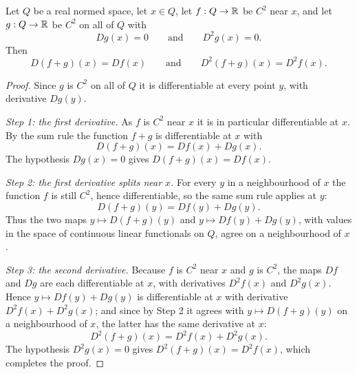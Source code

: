 \begin{lemma}
Let $Q$ be a real normed space, let $x\in Q$, let $f:Q\to\mathbb{R}$ be $C^2$ near $x$, and let
$g:Q\to\mathbb{R}$ be $C^2$ on all of $Q$ with
\[
  Dg(x)=0\qquad\text{and}\qquad D^2g(x)=0 .
\]
Then
\[
  D(f+g)(x)=Df(x)\qquad\text{and}\qquad D^2(f+g)(x)=D^2f(x).
\]
\end{lemma}
\begin{proof}
Since $g$ is $C^2$ on all of $Q$ it is differentiable at every point $y$, with
derivative $Dg(y)$.

\emph{Step 1: the first derivative.}
As $f$ is $C^2$ near $x$ it is in particular differentiable at $x$. By the sum rule the
function $f+g$ is differentiable at $x$ with
\[
  D(f+g)(x)=Df(x)+Dg(x).
\]
The hypothesis $Dg(x)=0$ gives $D(f+g)(x)=Df(x)$.

\emph{Step 2: the first derivative splits near $x$.}
For every $y$ in a neighbourhood of $x$ the function $f$ is still $C^2$, hence
differentiable, so the same sum rule applies at $y$:
\[
  D(f+g)(y)=Df(y)+Dg(y).
\]
Thus the two maps $y\mapsto D(f+g)(y)$ and $y\mapsto Df(y)+Dg(y)$, with values in the
space of continuous linear functionals on $Q$, agree on a neighbourhood of $x$.

\emph{Step 3: the second derivative.}
Because $f$ is $C^2$ near $x$ and $g$ is $C^2$, the maps $Df$ and $Dg$ are each
differentiable at $x$, with derivatives $D^2f(x)$ and $D^2g(x)$. Hence
$y\mapsto Df(y)+Dg(y)$ is differentiable at $x$ with derivative $D^2f(x)+D^2g(x)$; and
since by Step 2 it agrees with $y\mapsto D(f+g)(y)$ on a neighbourhood of $x$, the
latter has the same derivative at $x$:
\[
  D^2(f+g)(x)=D^2f(x)+D^2g(x).
\]
The hypothesis $D^2g(x)=0$ gives $D^2(f+g)(x)=D^2f(x)$, which completes the proof.
\end{proof}
